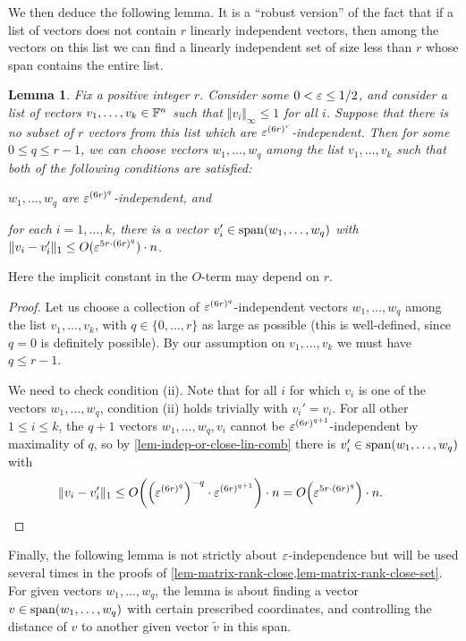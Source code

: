 \documentclass{daj}
\theoremstyle{plain}
\theoremstyle{plain}
\newtheorem{lem}[thm]{Lemma}
\theoremstyle{plain}
\theoremstyle{plain}
\theoremstyle{definition}
\theoremstyle{plain}
\theoremstyle{plain}
\theoremstyle{definition}
\theoremstyle{definition}
\theoremstyle{plain}
\let\originalleft\left
\let\originalright\right
\renewcommand{\left}{\mathopen{}\mathclose\bgroup\originalleft}
\renewcommand{\right}{\aftergroup\egroup\originalright}
\begin{document}
We then deduce the following lemma. It is a ``robust version'' of the fact that if a list of vectors does not contain $r$ linearly independent vectors, then among the vectors on this list we can find a linearly independent set of size less than $r$ whose span contains the entire list.

\begin{lem}\label{lem-choose-from-list}
Fix a positive integer $r$. Consider some $0< \varepsilon\leq 1/2$, and consider a list of vectors $v_1,\dots,v_k\in \mathbb{F}^n$ such that $\Vert v_i\Vert_\infty\le 1$ for all $i$. Suppose that there is no subset of $r$ vectors from this list which are $\varepsilon^{(6r)^r}$-independent. Then for some $0\leq q\leq r-1$, we can choose vectors $w_1,\dots,w_{q}$ among the list $v_1,\dots,v_k$ such that both of the following conditions are satisfied:
\begin{compactitem}
\item[(i)] $w_1,\dots, w_q$ are $\varepsilon^{(6r)^q}$-independent, and
\item[(ii)]for each $i=1,\dots,k$, there is a vector $v_i'\in \operatorname{span}(w_1,\dots,w_q)$ with $\Vert v_i-v_i'\Vert_1\leq O(\varepsilon^{5r\cdot (6r)^q})\cdot n$.
\end{compactitem}
\end{lem}

Here the implicit constant in the $O$-term may depend on $r$.

\begin{proof}
Let us choose a collection of $\varepsilon^{(6r)^q}$-independent vectors $w_1,\dots,w_{q}$ among the list $v_1,\dots,v_k$, with $q\in \{0,\dots,r\}$ as large as possible (this is well-defined, since $q=0$ is definitely possible). By our assumption on $v_1,\dots,v_k$ we must have $q\leq r-1$.

We need to check condition (ii). Note that for all $i$ for which $v_i$ is one of the vectors $w_1,\dots,w_q$, condition (ii) holds trivially with $v_i'=v_i$. For all other $1\leq i\leq k$, the $q+1$ vectors $w_1,\dots,w_{q}, v_i$ cannot be $\varepsilon^{(6r)^{q+1}}$-independent by maximality of $q$, so by \cref{lem-indep-or-close-lin-comb} there is $v_i'\in \operatorname{span}(w_1,\dots,w_q)$ with
\[\Vert v_i-v_i'\Vert_1\leq O\left(\left(\eps^{(6r)^q}\right)^{-q}\cdot \eps^{(6r)^{q+1}}\right)\cdot n=O\left(\eps^{5r\cdot (6r)^q}\right)\cdot n.\tag*{\qedhere}\]
\end{proof}

Finally, the following lemma is not strictly about $\varepsilon$-independence but will be used several times in the proofs of \cref{lem-matrix-rank-close,lem-matrix-rank-close-set}. For given vectors $w_1,\dots,w_q$, the lemma is about finding a vector $v\in \operatorname{span}(w_1,\dots,w_q)$ with certain prescribed coordinates, and controlling the distance of $v$ to another given vector $\tilde{v}$ in this span.
\end{document}
